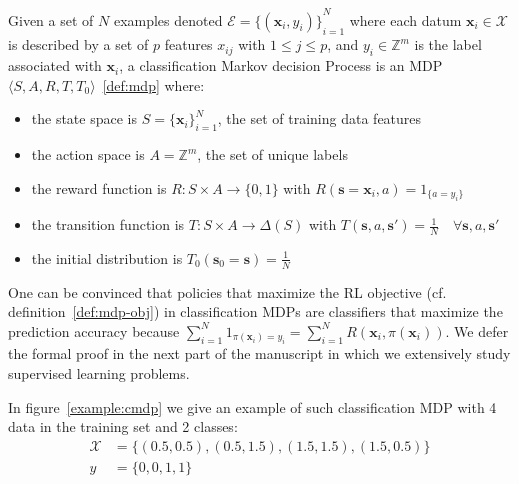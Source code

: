 \begin{definition}\label{def:cmdp}
    Given a set of $N$ examples denoted $\mathcal{E} = {\{(\boldsymbol{x}_i, y_i)\}}_{i=1}^N$ where each datum $\boldsymbol{x}_i \in \mathcal{X}$ is described by a set of $p$ features $x_{ij}$ with $1\leq j \leq p$, and $y_i \in \mathbb{Z}^m$ is the label associated with $\boldsymbol{x}_i$, a classification Markov decision Process is an MDP $\langle S, A, R, T, T_0 \rangle$~\ref{def:mdp} where:
    \begin{itemize}
        \item the state space is $S={\{\boldsymbol{x}_i\}}_{i=1}^N$, the set of training data features
        \item the action space is $A=\mathbb{Z}^m$, the set of unique labels
        \item the reward function is $R:S\times A \rightarrow \{0, 1\}$ with $R(\boldsymbol{s}=\boldsymbol{x}_i, a) = 1_{\{a=y_i\}}$
        \item the transition function is $T:S\times A \rightarrow \Delta(S)$ with $T(\boldsymbol{s}, a, \boldsymbol{s}') = \frac{1}{N} \quad \forall \boldsymbol{s}, a, \boldsymbol{s}'$
        \item the initial distribution is $T_0(\boldsymbol{s}_0 = \boldsymbol{s}) = \frac{1}{N}$
    \end{itemize}
\end{definition}

One can be convinced that policies that maximize the RL objective (cf. definition~\ref{def:mdp-obj}) in classification MDPs are classifiers that maximize the prediction accuracy because $\sum_{i=1}^N 1_{\pi(\boldsymbol{x}_i)=y_i} = \sum_{i=1}^N R(\boldsymbol{x}_i, \pi(\boldsymbol{x}_i))$.
We defer the formal proof in the next part of the manuscript in which we extensively study supervised learning problems.

In figure~\ref{example:cmdp} we give an example of such classification MDP with 4 data in the training set and 2 classes:
\begin{align*}
    \mathcal{X} &= \{(0.5, 0.5), (0.5, 1.5), (1.5, 1.5), (1.5, 0.5)\}\\
    y &= \{0, 0, 1, 1\} 
\end{align*}

